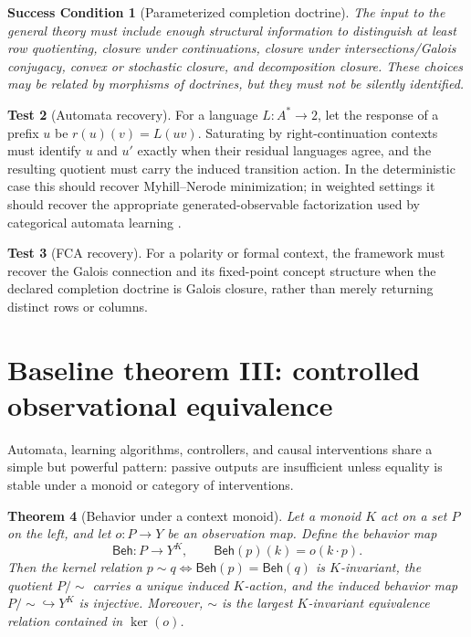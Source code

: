 \documentclass[11pt]{article}
\newtheorem{theorem}{Theorem}[section]
\newtheorem{condition}[theorem]{Success Condition}
\theoremstyle{definition}
\newtheorem{test}[theorem]{Test}
\theoremstyle{remark}
\newcommand{\Beh}{\mathsf{Beh}}
\newcommand{\into}{\hookrightarrow}
\begin{document}
\begin{condition}[Parameterized completion doctrine]
The input to the general theory must include enough structural information to distinguish at least row quotienting, closure under continuations, closure under intersections/Galois conjugacy, convex or stochastic closure, and decomposition closure. These choices may be related by morphisms of doctrines, but they must not be silently identified.
\end{condition}

\begin{test}[Automata recovery]
For a language $L:A^*\to 2$, let the response of a prefix $u$ be $r(u)(v)=L(uv)$. Saturating by right-continuation contexts must identify $u$ and $u'$ exactly when their residual languages agree, and the resulting quotient must carry the induced transition action. In the deterministic case this should recover Myhill--Nerode minimization; in weighted settings it should recover the appropriate generated-observable factorization used by categorical automata learning \cite{CALF2017}.
\end{test}

\begin{test}[FCA recovery]
For a polarity or formal context, the framework must recover the Galois connection and its fixed-point concept structure when the declared completion doctrine is Galois closure, rather than merely returning distinct rows or columns.
\end{test}

\section{Baseline theorem III: controlled observational equivalence}

Automata, learning algorithms, controllers, and causal interventions share a simple but powerful pattern: passive outputs are insufficient unless equality is stable under a monoid or category of interventions.

\begin{theorem}[Behavior under a context monoid]
Let a monoid $K$ act on a set $P$ on the left, and let $o:P\to Y$ be an observation map. Define the behavior map
\[
\Beh:P\to Y^K,\qquad \Beh(p)(k)=o(k\cdot p).
\]
Then the kernel relation $p\sim q\iff\Beh(p)=\Beh(q)$ is $K$-invariant, the quotient $P/{\sim}$ carries a unique induced $K$-action, and the induced behavior map $P/{\sim}\into Y^K$ is injective. Moreover, $\sim$ is the largest $K$-invariant equivalence relation contained in $\ker(o)$.
\end{theorem}
\end{document}
